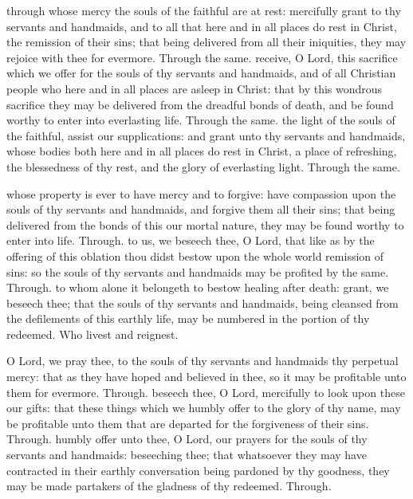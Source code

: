 \begin{multicols}{2}
 through whose mercy the souls of the faithful are at rest: mercifully grant to thy servants and handmaids, and to all that here and in all places do rest in Christ, the remission of their sins; that being delivered from all their iniquities, they may rejoice with thee for evermore. Through the same.
 receive, O Lord, this sacrifice which we offer for the souls of thy servants and handmaids, and of all Christian people who here and in all places are asleep in Christ: that by this wondrous sacrifice they may be delivered from the dreadful bonds of death, and be found worthy to enter into everlasting life. Through the same.
 the light of the souls of the faithful, assist our supplications: and grant unto thy servants and handmaids, whose bodies both here and in all places do rest in Christ, a place of refreshing, the blessedness of thy rest, and the glory of everlasting light. Through the same.

 whose property is ever to have mercy and to forgive: have compassion upon the souls of thy servants and handmaids, and forgive them all their sins; that being delivered from the bonds of this our mortal nature, they may be found worthy to enter into life. Through.
 to us, we beseech thee, O Lord, that like as by the offering of this oblation thou didst bestow upon the whole world remission of sins: so the souls of thy servants and handmaids may be profited by the same. Through.
 to whom alone it belongeth to bestow healing after death: grant, we beseech thee; that the souls of thy servants and handmaids, being cleansed from the defilements of this earthly life, may be numbered in the portion of thy redeemed. Who livest and reignest.

 O Lord, we pray thee, to the souls of thy servants and handmaids thy perpetual mercy: that as they have hoped and believed in thee, so it may be profitable unto them for evermore. Through.
 beseech thee, O Lord, mercifully to look upon these our gifts: that these things which we humbly offer to the glory of thy name, may be profitable unto them that are departed for the forgiveness of their sins. Through.
 humbly offer unto thee, O Lord, our prayers for the souls of thy servants and handmaids: beseeching thee; that whatsoever they may have contracted in their earthly conversation being pardoned by thy goodness, they may be made partakers of the gladness of thy redeemed. Through.
\end{multicols}